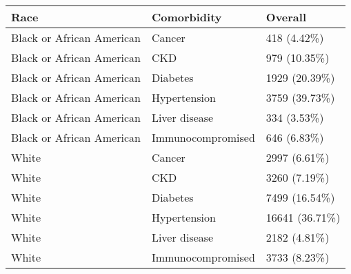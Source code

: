 \begin{table}[ht]
\centering
\begin{tabular}{lll}
  \hline
Race & Comorbidity & Overall \\ 
  \hline
Black or African American & Cancer & 418 (4.42\%) \\ 
  Black or African American & CKD & 979 (10.35\%) \\ 
  Black or African American & Diabetes & 1929 (20.39\%) \\ 
  Black or African American & Hypertension & 3759 (39.73\%) \\ 
  Black or African American & Liver disease & 334 (3.53\%) \\ 
  Black or African American & Immunocompromised & 646 (6.83\%) \\ 
  White & Cancer & 2997 (6.61\%) \\ 
  White & CKD & 3260 (7.19\%) \\ 
  White & Diabetes & 7499 (16.54\%) \\ 
  White & Hypertension & 16641 (36.71\%) \\ 
  White & Liver disease & 2182 (4.81\%) \\ 
  White & Immunocompromised & 3733 (8.23\%) \\ 
   \hline
\end{tabular}
\end{table}
